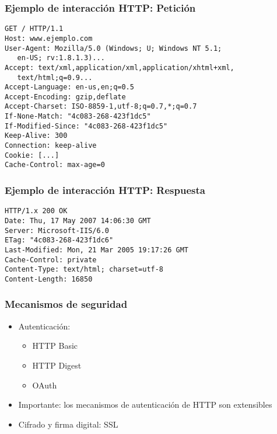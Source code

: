 \begin{frame}[fragile]
\frametitle{Ejemplo de interacción HTTP: Petición}

\begin{verbatim}
GET / HTTP/1.1
Host: www.ejemplo.com
User-Agent: Mozilla/5.0 (Windows; U; Windows NT 5.1; 
   en-US; rv:1.8.1.3)...
Accept: text/xml,application/xml,application/xhtml+xml,
   text/html;q=0.9...
Accept-Language: en-us,en;q=0.5
Accept-Encoding: gzip,deflate
Accept-Charset: ISO-8859-1,utf-8;q=0.7,*;q=0.7
If-None-Match: "4c083-268-423f1dc5"
If-Modified-Since: "4c083-268-423f1dc5"
Keep-Alive: 300
Connection: keep-alive
Cookie: [...]
Cache-Control: max-age=0
\end{verbatim}

\end{frame}


\begin{frame}[fragile]
\frametitle{Ejemplo de interacción HTTP: Respuesta}

\begin{verbatim}
HTTP/1.x 200 OK
Date: Thu, 17 May 2007 14:06:30 GMT
Server: Microsoft-IIS/6.0
ETag: "4c083-268-423f1dc6"
Last-Modified: Mon, 21 Mar 2005 19:17:26 GMT
Cache-Control: private
Content-Type: text/html; charset=utf-8
Content-Length: 16850
\end{verbatim}

\end{frame}

\begin{frame}
\frametitle{Mecanismos de seguridad}

\begin{itemize}
\item Autenticación:
  \begin{itemize}
  \item HTTP Basic
  \item HTTP Digest
  \item OAuth
  \end{itemize}
\item Importante: los mecanismos de autenticación de HTTP son extensibles
\item Cifrado y firma digital: SSL
\end{itemize}

\end{frame}


